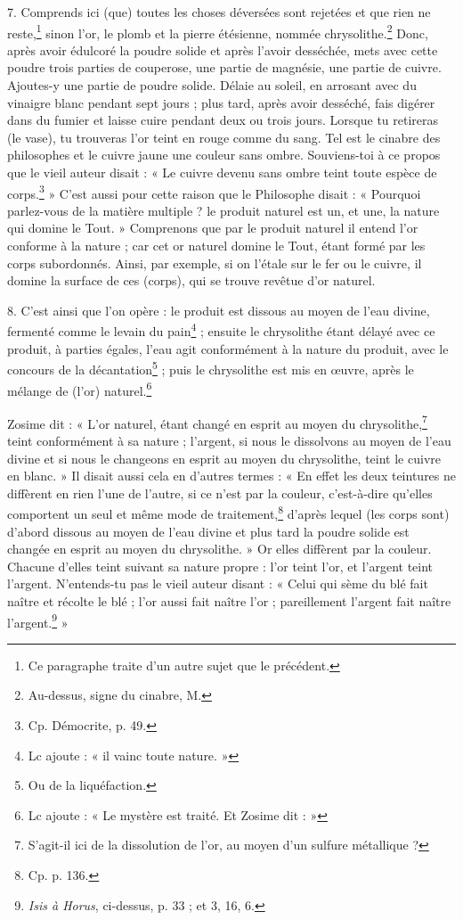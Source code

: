 \documentclass[a4paper, 11pt, oneside, polutonikogreek, french]{article}
\begin{document}
7. Comprends ici (que) toutes les choses déversées sont rejetées et que rien ne reste,\footnote{Ce paragraphe traite d'un autre sujet que le précédent.} sinon l'or, le plomb et la pierre étésienne, nommée chrysolithe.\footnote{Au-dessus, signe du cinabre, M.} Donc, après avoir édulcoré la poudre solide et après l'avoir desséchée, mets avec cette poudre trois parties de couperose, une partie de magnésie, une partie de cuivre. Ajoutes-y une partie de poudre solide. Délaie au soleil, en arrosant avec du vinaigre blanc pendant sept jours ; plus tard, après avoir desséché, fais digérer dans du fumier et laisse cuire pendant deux ou trois jours. Lorsque tu retireras (le vase), tu trouveras l'or teint en rouge comme du sang. Tel est le cinabre des philosophes et le cuivre jaune une couleur sans ombre. Souviens-toi à ce propos que le vieil auteur disait : « Le cuivre devenu sans ombre teint toute espèce de corps.\footnote{Cp. Démocrite, p. 49.} » C'est aussi pour cette raison que le Philosophe disait : « Pourquoi parlez-vous de la matière multiple ? le produit naturel est un, et une, la nature qui domine le Tout. » Comprenons que par le produit naturel il entend l'or conforme à la nature ; car cet or naturel domine le Tout, étant formé par les corps subordonnés. Ainsi, par exemple, si on l'étale sur le fer ou le cuivre, il domine la surface de ces (corps), qui se trouve revêtue d'or naturel.

8. C'est ainsi que l'on opère : le produit est dissous au moyen de l'eau divine, fermenté comme le levain du pain\footnote{Lc ajoute : « il vainc toute nature. »} ; ensuite le chrysolithe étant délayé avec ce produit, à parties égales, l'eau agit conformément à la nature du produit, avec le concours de la décantation\footnote{Ou de la liquéfaction.} ; puis le chrysolithe est mis en œuvre, après le mélange de (l'or) naturel.\footnote{Lc ajoute : « Le mystère est traité. Et Zosime dit : »}

Zosime dit : « L'or naturel, étant changé en esprit au moyen du chrysolithe,\footnote{S'agit-il ici de la dissolution de l'or, au moyen d'un sulfure métallique ?} teint conformément à sa nature ; l'argent, si nous le dissolvons au moyen de l'eau divine et si nous le changeons en esprit au moyen du chrysolithe, teint le cuivre en blanc. » Il disait aussi cela en d'autres termes : « En effet les deux teintures ne diffèrent en rien l'une de l'autre, si ce n'est par la couleur, c'est-à-dire qu'elles comportent un seul et même mode de traitement,\footnote{Cp. p. 136.} d'après lequel (les corps sont) d'abord dissous au moyen de l'eau divine et plus tard la poudre solide est changée en esprit au moyen du chrysolithe. » Or elles diffèrent par la couleur. Chacune d'elles teint suivant sa nature propre : l'or teint l'or, et l'argent teint l'argent. N'entends-tu pas le vieil auteur disant : « Celui qui sème du blé fait naître et récolte le blé ; l'or aussi fait naître l'or ; pareillement l'argent fait naître l'argent.\footnote{\emph{Isis à Horus}, ci-dessus, p. 33 ; et 3, 16, 6.} »
\end{document}
